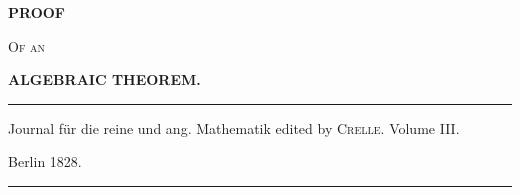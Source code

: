 \clearpage
{}
\thispagestyle{empty}
\begin{center}
\vspace*{2cm}
{\Large\bfseries PROOF}\par
\vspace{1cm}
\textsc{Of an}\par
\vspace{1cm}
{\Large\bfseries ALGEBRAIC THEOREM.}\par
\vspace{3cm}
\rule{0.85\linewidth}{0.4pt}\par\medskip
Journal für die reine und ang. Mathematik edited by \textsc{Crelle}. Volume III.\par
\medskip Berlin 1828.\par\medskip
\rule{0.85\linewidth}{0.4pt}
\end{center}
\clearpage
